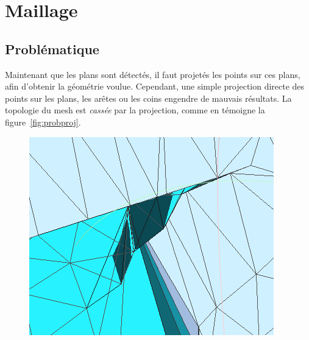 \documentclass[12pt, twoside]{article}
\let\oldsection\section
\def\section{\cleardoublepage\oldsection}
\begin{document}
\section{Maillage}
\subsection{Problématique}
Maintenant que les plans sont détectés, il faut projetés les points sur ces plans, afin d'obtenir la géométrie voulue. Cependant, une simple projection directe des points sur les plans, les arêtes ou les coins engendre de mauvais résultats. La topologie du mesh est \textit{cassée} par la projection, comme en témoigne la figure~\ref{fig:probproj}.

\begin{figure}[h]
\centering
\includegraphics[scale=0.55]{prob1.png} \includ
\end{figure}
\end{document}
